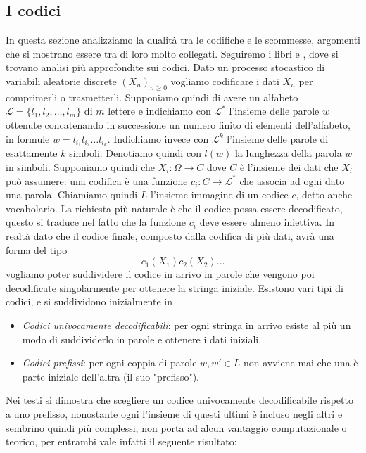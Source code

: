 \documentclass[a4paper,11pt]{book}
\theoremstyle{plain}
\theoremstyle{definition}
\theoremstyle{remark}
\begin{document}
\subsection{I codici}
In questa sezione analizziamo la dualità tra le codifiche e le scommesse, argomenti che si mostrano essere tra di loro molto collegati. Seguiremo i libri \cite{Mennucci} e \cite{CTElInfTeo}, dove si trovano analisi più approfondite sui codici.\newline
Dato un processo stocastico di variabili aleatorie discrete $(X_n)_{n\geq 0}$ vogliamo codificare i dati $X_n$ per comprimerli o trasmetterli. Supponiamo quindi di avere un alfabeto $\mathcal{L}=\{l_1,l_2,\ldots, l_m\}$ di $m$ lettere e indichiamo con $\mathcal{L}^*$ l'insieme delle parole $w$ ottenute concatenando in successione un numero finito di elementi dell'alfabeto, in formule $w=l_{i_1}l_{i_2}\ldots l_{i_k}$. Indichiamo invece con $\mathcal{L}^k$ l'insieme delle parole di esattamente $k$ simboli. Denotiamo quindi con $l(w)$ la lunghezza della parola $w$ in simboli.\newline
Supponiamo quindi che $X_i:\Omega\rightarrow C$ dove $C$ è l'insieme dei dati che $X_i$ può assumere: una codifica è una funzione $c_i:C\rightarrow \mathcal{L}^*$ che associa ad ogni dato una parola. Chiamiamo quindi $L$ l'insieme immagine di un codice $c$, detto anche vocabolario. \newline
La richiesta più naturale è che il codice possa essere decodificato, questo si traduce nel fatto che la funzione $c_i$ deve essere almeno iniettiva. In realtà dato che il codice finale, composto dalla codifica di più dati, avrà una forma del tipo
\begin{equation*}
	c_1(X_1)c_2(X_2)\ldots
\end{equation*}
vogliamo poter suddividere il codice in arrivo in parole che vengono poi decodificate singolarmente per ottenere la stringa iniziale.\newline
Esistono vari tipi di codici, e si suddividono inizialmente in
\begin{itemize}
	\item \textit{Codici univocamente decodificabili}: per ogni stringa in arrivo esiste al più un modo di suddividerlo in parole e ottenere i dati iniziali.
	\item \textit{Codici prefissi}: per ogni coppia di parole $w,w'\in L$ non avviene mai che una è parte iniziale dell'altra (il suo "prefisso").
\end{itemize}
Nei testi si dimostra che scegliere un codice univocamente decodificabile rispetto a uno prefisso, nonostante ogni l'insieme di questi ultimi è incluso negli altri e sembrino quindi più complessi, non porta ad alcun vantaggio computazionale o teorico, per entrambi vale infatti il seguente risultato:
\end{document}
